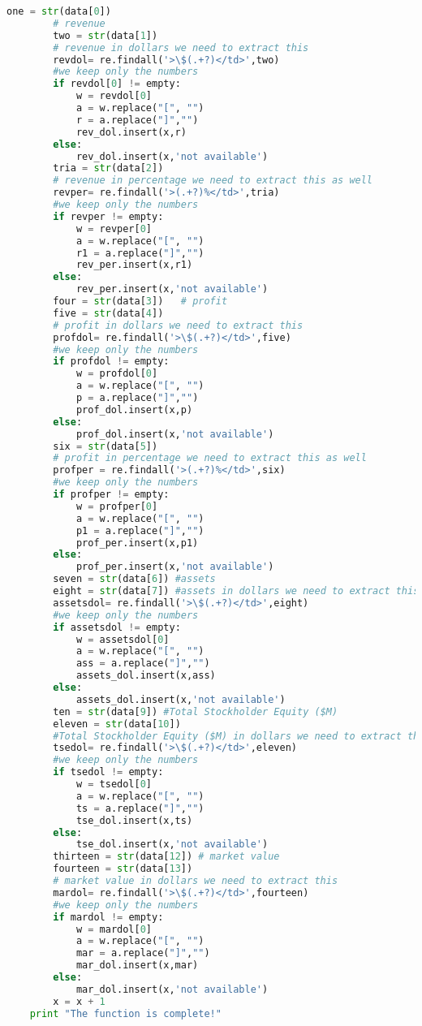\documentclass{article}
\begin{document}
\begin{lstlisting}[language=Python]
        one = str(data[0]) 
        # revenue
        two = str(data[1]) 
        # revenue in dollars we need to extract this
        revdol= re.findall('>\$(.+?)</td>',two) 
        #we keep only the numbers
        if revdol[0] != empty:
            w = revdol[0]
            a = w.replace("[", "")
            r = a.replace("]","")
            rev_dol.insert(x,r)
        else:
            rev_dol.insert(x,'not available')
        tria = str(data[2])
        # revenue in percentage we need to extract this as well
        revper= re.findall('>(.+?)%</td>',tria) 
        #we keep only the numbers
        if revper != empty:    
            w = revper[0]
            a = w.replace("[", "")
            r1 = a.replace("]","")    
            rev_per.insert(x,r1) 
        else:
            rev_per.insert(x,'not available')
        four = str(data[3])   # profit     
        five = str(data[4])   
        # profit in dollars we need to extract this   
        profdol= re.findall('>\$(.+?)</td>',five) 
        #we keep only the numbers
        if profdol != empty:
            w = profdol[0]
            a = w.replace("[", "")
            p = a.replace("]","")
            prof_dol.insert(x,p)
        else:
            prof_dol.insert(x,'not available')
        six = str(data[5])    
        # profit in percentage we need to extract this as well   
        profper = re.findall('>(.+?)%</td>',six) 
        #we keep only the numbers
        if profper != empty:
            w = profper[0]
            a = w.replace("[", "")
            p1 = a.replace("]","")    
            prof_per.insert(x,p1)
        else:
            prof_per.insert(x,'not available')
        seven = str(data[6]) #assets
        eight = str(data[7]) #assets in dollars we need to extract this
        assetsdol= re.findall('>\$(.+?)</td>',eight) 
        #we keep only the numbers
        if assetsdol != empty:
            w = assetsdol[0]
            a = w.replace("[", "")
            ass = a.replace("]","")
            assets_dol.insert(x,ass)
        else:
            assets_dol.insert(x,'not available')
        ten = str(data[9]) #Total Stockholder Equity ($M)    
        eleven = str(data[10]) 
        #Total Stockholder Equity ($M) in dollars we need to extract this
        tsedol= re.findall('>\$(.+?)</td>',eleven) 
        #we keep only the numbers
        if tsedol != empty:
            w = tsedol[0]
            a = w.replace("[", "")
            ts = a.replace("]","")
            tse_dol.insert(x,ts)
        else:
            tse_dol.insert(x,'not available')
        thirteen = str(data[12]) # market value
        fourteen = str(data[13]) 
        # market value in dollars we need to extract this
        mardol= re.findall('>\$(.+?)</td>',fourteen) 
        #we keep only the numbers
        if mardol != empty:
            w = mardol[0]
            a = w.replace("[", "")
            mar = a.replace("]","")
            mar_dol.insert(x,mar)
        else:
            mar_dol.insert(x,'not available')
        x = x + 1
    print "The function is complete!"
 



\end{lstlisting}
\end{document}

